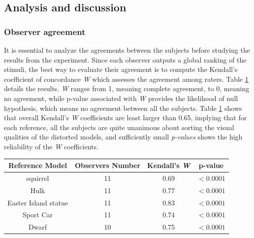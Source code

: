 \subsection{Analysis and discussion}
\subsubsection{Observer agreement}
It is essential to analyze the agreements between the subjects before studying the results from the experiment. Since each observer outputs a global ranking of the stimuli, the best way to evaluate their agreement is to compute the Kendall's coefficient of concordance \textit{W} \cite{Kendall_1940} which assesses the agreement among raters. Table \ref{tab-W} details the results. \textit{W} ranges from 1, meaning complete agreement, to 0, meaning no agreement, while p-value associated with \textit{W} provides the likelihood of null hypothesis, which means no agreement between all the subjects. Table \ref{tab-W} shows that overall Kendall’s \textit{W} coefficients are least larger than 0.65, implying that for each reference, all the subjects are quite unanimous about sorting the visual qualities of the distorted models, and sufficiently small \textit{p-values} shows the high reliability of the \textit{W} coefficients.\\
\begin{table}

    \begin{tabular}{c c  c c}
        \textbf{Reference Model} & \textbf{Observers Number} & \textbf{Kendall's \textit{W}} & \textbf{p-value} \\ \hline
        squirrel & 11 & 0.69 & $<0.0001$ \\ 
        Hulk & 11 & 0.77 & $<0.0001$ \\ 
        Easter Island statue & 11 & 0.83 & $<0.0001$ \\ 
        Sport Car & 11 & 0.74 & $<0.0001$ \\ 
        Dwarf & 10 & 0.75 & $<0.0001$ \\ \hline
    \end{tabular}%
		
   \label{tab-W}
\end{table}


